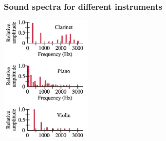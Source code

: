 \documentclass[]{beamer}
\begin{document}
\begin{frame}
\frametitle{Sound spectra for different instruments}

  \begin{center}
  \includegraphics[height=2.5in]{images4/soundspectra.jpg}
\end{center}




  \end{frame}



\end{document}
